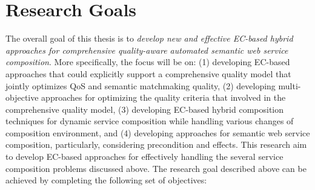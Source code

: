 \section{Research Goals}
The overall goal of this thesis is to \emph{develop new and effective EC-based hybrid approaches for comprehensive quality-aware automated semantic web service composition}. More specifically, the focus will be on: (1) developing EC-based approaches that could explicitly support a comprehensive quality model that jointly optimizes QoS and semantic matchmaking quality, (2) developing multi-objective approaches for optimizing the quality criteria that involved in the comprehensive quality model, (3) developing EC-based hybrid composition techniques for dynamic service composition while handling various changes of composition environment, and  (4) developing approaches for semantic web service composition, particularly, considering precondition and effects. This research aim to develop EC-based approaches for effectively handling the several service composition problems discussed above. The research goal described above can be achieved by completing the following set of objectives:


